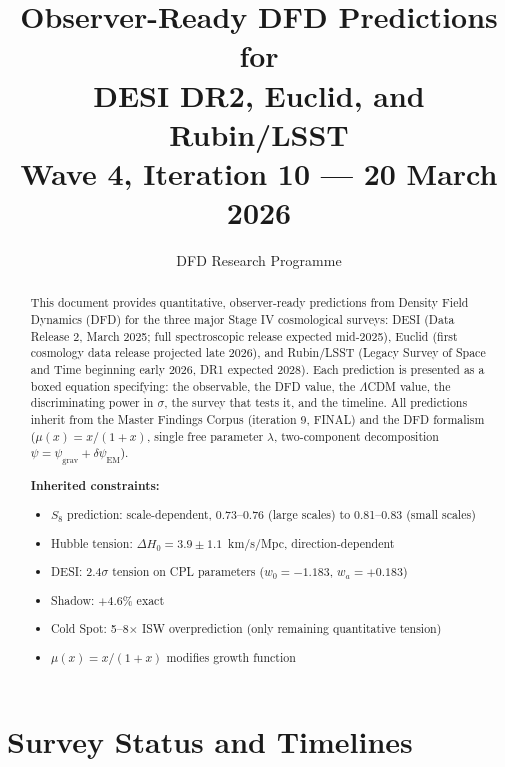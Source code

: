 \documentclass[12pt]{article}
\title{Observer-Ready DFD Predictions for\\DESI DR2, Euclid, and Rubin/LSST\\[6pt]
\large Wave 4, Iteration 10 --- 20 March 2026}
\author{DFD Research Programme}
\date{}
\newcommand{\LCDM}{$\Lambda$CDM}
\begin{document}
\maketitle

\begin{abstract}
This document provides quantitative, observer-ready predictions from Density Field Dynamics (DFD) for the three major Stage IV cosmological surveys: DESI (Data Release 2, March 2025; full spectroscopic release expected mid-2025), Euclid (first cosmology data release projected late 2026), and Rubin/LSST (Legacy Survey of Space and Time beginning early 2026, DR1 expected 2028). Each prediction is presented as a boxed equation specifying: the observable, the DFD value, the \LCDM{} value, the discriminating power in $\sigma$, the survey that tests it, and the timeline. All predictions inherit from the Master Findings Corpus (iteration 9, FINAL) and the DFD formalism ($\mu(x)=x/(1+x)$, single free parameter $\lambda$, two-component decomposition $\psi = \psi_\mathrm{grav} + \delta\psi_\mathrm{EM}$).

\medskip\noindent\textbf{Inherited constraints:}
\begin{itemize}\setlength\itemsep{0pt}
\item $S_8$ prediction: scale-dependent, 0.73--0.76 (large scales) to 0.81--0.83 (small scales)
\item Hubble tension: $\Delta H_0 = 3.9\pm1.1$~km/s/Mpc, direction-dependent
\item DESI: 2.4$\sigma$ tension on CPL parameters ($w_0=-1.183$, $w_a=+0.183$)
\item Shadow: $+4.6\%$ exact
\item Cold Spot: 5--8$\times$ ISW overprediction (only remaining quantitative tension)
\item $\mu(x) = x/(1+x)$ modifies growth function
\end{itemize}
\end{abstract}

\tableofcontents
\newpage

\section{Survey Status and Timelines}
\end{document}
